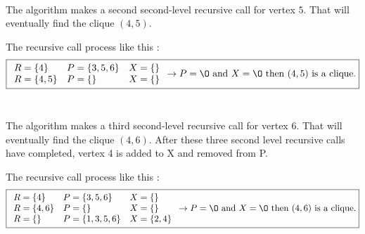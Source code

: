 \\
\begin{minipage}{0.4\textwidth}
\end{minipage}
\begin{minipage}{0.6\textwidth}
    The algorithm makes a second second-level recursive call for vertex $5$. That will eventually find the clique $(4,5)$.
\end{minipage}
The recursive call process like this  :
$$ \boxed{
        \begin{array}{lll}
            R = \{4\}   & P = \{3,5,6\} & X = \{\} \\
            R = \{4,5\} & P = \{\}      & X = \{\} \\
        \end{array}
        \rightarrow P = \O \text{ and } X = \O \text{ then } (4,5) \text{ is a clique.}
    }$$
\\
\begin{minipage}{0.4\textwidth}
\end{minipage}
\begin{minipage}{0.6\textwidth}
    The algorithm makes a third second-level recursive call for vertex $6$. That will eventually find the clique $(4, 6)$. After these three second level recursive calls have completed, vertex 4 is added to X and removed from P.
\end{minipage}
The recursive call process like this  :
$$ \boxed{
        \begin{array}{lll}
            R = \{4\}   & P = \{3,5,6\}   & X = \{\}    \\
            R = \{4,6\} & P = \{\}        & X = \{\}    \\
            R = \{\}    & P = \{1,3,5,6\} & X = \{2,4\} \\
        \end{array}
        \rightarrow P = \O \text{ and } X = \O \text{ then } (4,6) \text{ is a clique.}
    }$$

